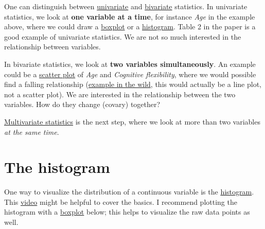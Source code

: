 \documentclass[
]{book}
\begin{document}
One can distinguish between \href{https://en.wikipedia.org/wiki/Univariate_analysis}{univariate} and \href{https://en.wikipedia.org/wiki/Bivariate_analysis}{bivariate} statistics.
In univariate statistics, we look at \textbf{one variable at a time}, for instance \emph{Age} in the example above,
where we could draw a \href{https://en.wikipedia.org/wiki/Box_plot}{boxplot} or a \href{https://en.wikipedia.org/wiki/Histogram}{histogram}.
Table 2 in the paper is a good example of univariate statistics. We are not so much interested in the relationship between variables.

In bivariate statistics, we look at \textbf{two variables simultaneously}.
An example could be a \href{https://en.wikipedia.org/wiki/Scatter_plot}{scatter plot} of \emph{Age} and \emph{Cognitive flexibility},
where we would possible find a falling relationship (\href{https://pmc.ncbi.nlm.nih.gov/articles/PMC4906299/figure/FI00674-1/}{example in the wild}, this would actually be a line plot, not a scatter plot).
We are interested in the relationship between the two variables. How do they change (covary) together?

\href{https://en.wikipedia.org/wiki/Multivariate_statistics}{Multivariate statistics} is the next step, where we look at more than two variables \emph{at the same time}.

\section{The histogram}\label{the-histogram}

One way to visualize the distribution of a continuous variable is the \href{https://en.wikipedia.org/wiki/Histogram}{histogram}.
This \href{https://www.youtube.com/watch?v=gSEYtAjuZ-Y&ab_channel=KhanAcademy}{video} might be helpful to cover the basics.
I recommend plotting the histogram with a \href{https://en.wikipedia.org/wiki/Box_plot}{boxplot} below; this helps
to visualize the raw data points as well.
\end{document}
